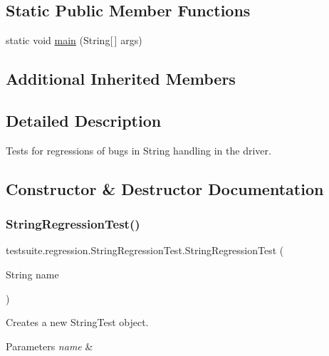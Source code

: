 \subsection*{Static Public Member Functions}
\begin{DoxyCompactItemize}
\item 
static void \mbox{\hyperlink{classtestsuite_1_1regression_1_1_string_regression_test_ab7f0eee5f91473ea32fec25015ad945d}{main}} (String\mbox{[}$\,$\mbox{]} args)
\end{DoxyCompactItemize}
\subsection*{Additional Inherited Members}


\subsection{Detailed Description}
Tests for regressions of bugs in String handling in the driver. 

\subsection{Constructor \& Destructor Documentation}
\mbox{\label{classtestsuite_1_1regression_1_1_string_regression_test_a74cdd190073561c8807d281869ac10c5}} 
\subsubsection{\texorpdfstring{String\+Regression\+Test()}{StringRegressionTest()}}
{\footnotesize\ttfamily testsuite.\+regression.\+String\+Regression\+Test.\+String\+Regression\+Test (\begin{DoxyParamCaption}\item[{String}]{name }\end{DoxyParamCaption})}

Creates a new String\+Test object.


\begin{DoxyParams}{Parameters}
{\em name} & \\
\hline
\end{DoxyParams}


